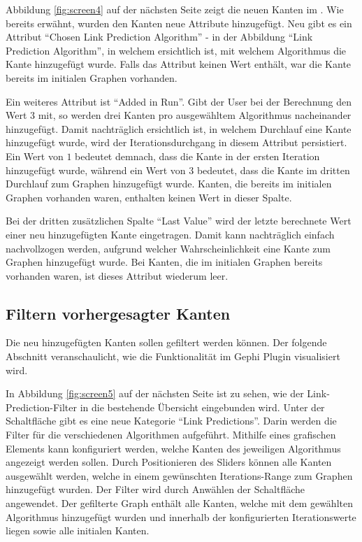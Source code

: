 Abbildung \ref{fig:screen4} auf der nächsten Seite zeigt die neuen Kanten im .
Wie bereits erwähnt, wurden den Kanten neue Attribute hinzugefügt.
Neu gibt es ein Attribut ``Chosen Link Prediction Algorithm'' - in der Abbildung ``Link Prediction Algorithm'', in welchem ersichtlich ist, mit welchem Algorithmus die Kante hinzugefügt wurde.
Falls das Attribut keinen Wert enthält, war die Kante bereits im initialen Graphen vorhanden.

Ein weiteres Attribut ist ``Added in Run''. Gibt der User bei der Berechnung den Wert $3$ mit, so werden drei Kanten pro
ausgewähltem Algorithmus nacheinander hinzugefügt. Damit nachträglich ersichtlich ist, in welchem Durchlauf eine
Kante hinzugefügt wurde, wird der Iterationsdurchgang in diesem Attribut persistiert.
Ein Wert von $1$ bedeutet demnach, dass die Kante in der ersten Iteration hinzugefügt wurde, während ein Wert von $3$ bedeutet, dass die Kante im dritten Durchlauf zum Graphen hinzugefügt wurde.
Kanten, die bereits im initialen Graphen vorhanden waren, enthalten keinen Wert in dieser Spalte.

Bei der dritten zusätzlichen Spalte ``Last Value'' wird der letzte berechnete Wert einer neu hinzugefügten Kante eingetragen.
Damit kann nachträglich einfach nachvollzogen werden, aufgrund welcher Wahrscheinlichkeit eine Kante zum Graphen hinzugefügt wurde.
Bei Kanten, die im initialen Graphen bereits vorhanden waren, ist dieses Attribut wiederum leer.

\subsection{Filtern vorhergesagter Kanten}

Die neu hinzugefügten Kanten sollen gefiltert werden können.
Der folgende Abschnitt veranschaulicht, wie die Funktionalität im Gephi Plugin visualisiert wird.

In Abbildung \ref{fig:screen5} auf der nächsten Seite ist zu sehen, wie der Link-Prediction-Filter in die bestehende Übersicht eingebunden wird.
Unter der Schaltfläche  gibt es eine neue Kategorie ``Link Predictions''.
Darin werden die Filter für die verschiedenen Algorithmen aufgeführt.
Mithilfe eines grafischen Elements kann konfiguriert werden, welche Kanten des jeweiligen Algorithmus angezeigt werden sollen.
Durch Positionieren des Sliders können alle Kanten ausgewählt werden, welche in einem gewünschten Iterations-Range zum Graphen hinzugefügt wurden.
Der Filter wird durch Anwählen der Schaltfläche  angewendet. Der gefilterte Graph enthält alle Kanten, welche mit dem gewählten Algorithmus hinzugefügt wurden und
innerhalb der konfigurierten Iterationswerte liegen sowie alle initialen Kanten.

